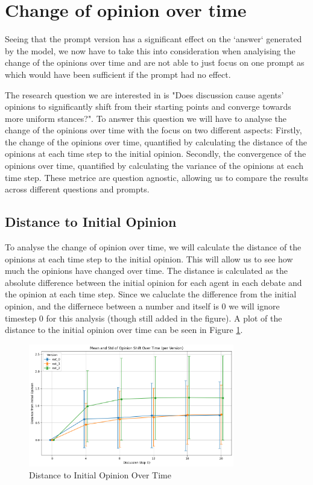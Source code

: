 \documentclass[12pt]{article}
\begin{document}
\section{Change of opinion over time}
Seeing that the prompt version has a significant effect on the `answer` generated by the model, we now have to take this into consideration when analyising the change of the opinions over time and are not able to just focus on one prompt as which would have been sufficient if the prompt had no effect.

The research question we are interested in is "Does discussion cause agents' opinions to significantly shift from their starting points and converge towards more uniform stances?". To answer this question we will have to analyse the change of the opinions over time with the focus on two different aspects: Firstly, the change of the opinions over time, quantified by calculating the distance of the opinions at each time step to the initial opinion. Secondly, the convergence of the opinions over time, quantified by calculating the variance of the opinions at each time step. These metrice are question agnostic, allowing us to compare the results across different questions and prompts.

\subsection{Distance to Initial Opinion}

To analyse the change of opinion over time, we will calculate the distance of the opinions at each time step to the initial opinion. This will allow us to see how much the opinions have changed over time. The distance is calculated as the absolute difference between the initial opinion for each agent in each debate and the opinion at each time step. Since we caluclate the difference from the initial opinion, and the differnece between a number and itself is 0 we will ignore timestep 0 for this analysis (though still added in the figure). A plot of the distance to the initial opinion over time can be seen in Figure \ref{fig:distance_to_initial_opinion}.

\begin{figure}[h]
\centering
\includegraphics[width=0.8\textwidth]{img/distance_to_initial_opinion.png}
\caption{Distance to Initial Opinion Over Time}
\label{fig:distance_to_initial_opinion}
\end{figure}
\end{document}
